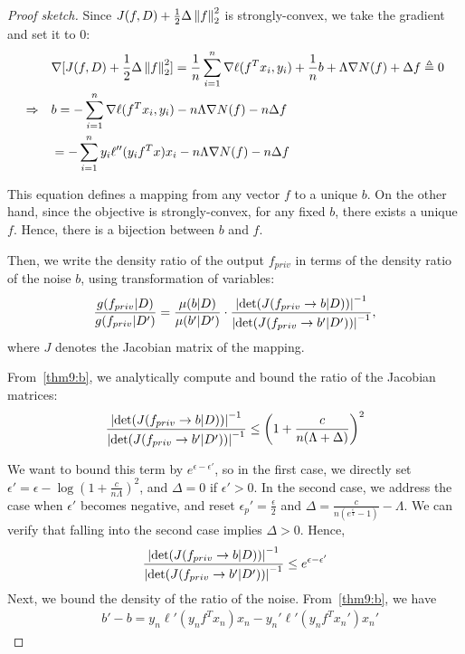 \documentclass{article} %
\begin{document}
\begin{proof}[Proof sketch]
Since $J(f, D) + \frac{1}{2}\Delta \left\lVert f\right\rVert_2^2$ is strongly-convex, we take the gradient and set it to 0:
\begin{align}
& \nabla [J(f, D) +  \frac{1}{2}\Delta \left\lVert f\right\rVert_2^2]= \frac{1}{n}\sum_{i=1}^n \nabla \ell(f^T x_i, y_i) + \frac{1}{n} b+ \Lambda \nabla N(f) + \Delta f  \triangleq 0\nonumber\\
\Rightarrow \quad & b =  -\sum_{i=1}^n \nabla \ell(f^Tx_i, y_i) -n \Lambda \nabla N(f) - n\Delta f\nonumber\\
& =  -\sum_{i=1}^n y_i \ell''(y_i f^T x) x_i - n\Lambda \nabla N(f) - n\Delta f\label{thm9:b}
\end{align}

This equation defines a mapping from any vector $f$ to a unique $b$. On the other hand, since the objective is strongly-convex, for any fixed $b$, there exists a unique $f$. Hence, there is a bijection between $b$ and $f$.

Then, we write the density ratio of the output $f_{priv}$ in terms of the density ratio of the noise $b$, using transformation of variables:
\begin{align}
\frac{g(f_{priv} | D)}{g(f_{priv} | D')} = \frac{\mu(b | D)}{\mu(b' | D')} \cdot \frac{\left\lvert\det(J(f_{priv} \rightarrow b | D))\right\rvert^{-1}}{\left\lvert\det(J(f_{priv} \rightarrow b' | D'))\right\rvert^{-1}}, \label{thm9:main}
\end{align}
where $J$ denotes the Jacobian matrix of the mapping.

From~\eqref{thm9:b}, we analytically compute and bound the ratio of the Jacobian matrices:
\begin{align*}\frac{\left\lvert\det(J(f_{priv} \rightarrow b | D))\right\rvert^{-1}}{\left\lvert\det(J(f_{priv} \rightarrow b' | D'))\right\rvert^{-1}} \le \left(1 + \frac{c}{n(\Lambda + \Delta)}\right)^2
\end{align*}

We want to bound this term by $e^{\epsilon - \epsilon'}$, so in the first case, we directly set $\epsilon' = \epsilon  - \log{(1 + \frac{c}{n\Lambda})^2}$, and $\Delta = 0$ if $\epsilon' > 0$. In the second case, we address the case when $\epsilon'$ becomes negative, and reset $\epsilon_p' = \frac{\epsilon}{2}$ and $\Delta = \frac{c}{n(e^{\frac{\epsilon}{4}}- 1)}- \Lambda$. We can verify that falling into the second case implies $\Delta > 0$. Hence,
\begin{align}
\frac{\left\lvert\det(J(f_{priv} \rightarrow b | D))\right\rvert^{-1}}{\left\lvert\det(J(f_{priv} \rightarrow b' | D'))\right\rvert^{-1}} \le e^{\epsilon - \epsilon'} \label{thm9:ratio_jacobian}
\end{align}
Next, we bound the density of the ratio of the noise. From~\eqref{thm9:b}, we have
\begin{align*}
& b' - b = y_n \ell'(y_n f^T x_n) x_n - y_n' \ell'(y_n f^T x_n') x_n'
\end{align*}


\end{proof}
\end{document}
